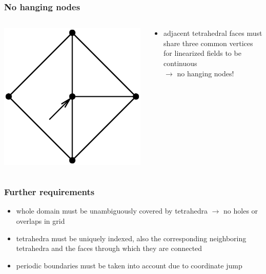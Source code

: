 \documentclass{beamer}
\begin{document}
\begin{frame}
\frametitle{No hanging nodes}
\begin{columns}[onlytextwidth]
	\begin{column}{0.45\textwidth}
		\begin{center}
		\vspace{-1cm}
\centering \includegraphics[trim={4 1 1 0.5cm},clip,width=1.1\textwidth]{FIGURES/HangingNode.eps}
\end{center}
\end{column}
	\begin{column}{0.55\textwidth}
	\begin{center}
				\begin{itemize}
			\item adjacent tetrahedral faces must share three common vertices for linearized fields to be continuous\\
			$\rightarrow$ no hanging nodes!
		\end{itemize}
	\end{center}
\end{column}
\end{columns}
\end{frame}

\begin{frame}
\frametitle{Further requirements}
\begin{itemize}
	\item whole domain must be unambiguously covered by tetrahedra $\rightarrow$ no holes or overlaps in grid
	\item tetrahedra must be uniquely indexed, also the corresponding neighboring tetrahedra and the faces through which they are connected
	\item periodic boundaries must be taken into account due to coordinate jump
\end{itemize}
\end{frame}
\end{document}
